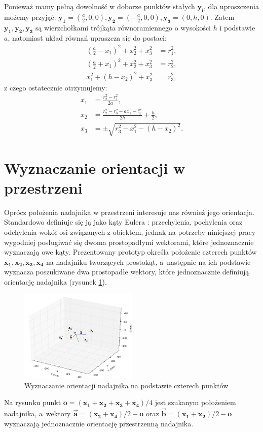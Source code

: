 Ponieważ mamy pełną dowolność w doborze punktów stałych $\boldsymbol{y_i}$, dla uproszczenia możemy przyjąć:
$\boldsymbol{y_1}=(\frac{a}{2},0,0), \boldsymbol{y_2}=(-\frac{a}{2},0,0), \boldsymbol{y_3}=(0,h,0)$. 
Zatem $\boldsymbol{y_1}, \boldsymbol{y_2}, \boldsymbol{y_3}$ są wierzchołkami
trójkąta równoramiennego o wysokości $h$ i podstawie $a$, natomiast układ równań upraszcza
się do postaci:
 \begin{align}
    \nonumber  (\tfrac{a}{2}-x_1)^2 + x_2^2 + x_3^2 &= r_1^2,
 \\ \nonumber  (\tfrac{a}{2}+x_1)^2 + x_2^2 + x_3^2 &= r_2^2,
 \\ \nonumber  x_1^2 + (h-x_2)^2 + x_3^2 &= r_3^2,
 \end{align}
z czego ostatecznie otrzymujemy:
 \begin{align}
    \nonumber  x_1 &= \frac{r_2^2 - r_1^2}{2a},
 \\ \nonumber  x_2 &= \frac{r_2^2 - r_3^2  - a x_1 - \frac{a^2}{4} }{2h}  + \frac{h}{2},
 \\ \nonumber  x_3 &= \pm \sqrt{r_3^2-x_1^2-(h-x_2)^2}.
 \end{align}


\section{Wyznaczanie orientacji w przestrzeni}

Oprócz położenia nadajnika w przestrzeni interesuje nas również jego orientacja.
Standardowo definiuje się ją jako kąty Eulera \cite{bib:katyEulera}: przechylenia, 
pochylenia oraz odchylenia wokół osi związanych z obiektem, jednak na potrzeby niniejszej pracy wygodniej 
posługiwać się dwoma prostopadłymi wektorami, które jednoznacznie wyznaczają owe kąty. 
Prezentowany prototyp określa położenie czterech punktów $\boldsymbol{x_1, x_2, x_3, x_4}$ na nadajniku tworzących prostokąt, a~następnie na ich podstawie wyznacza poszukiwane dwa prostopadłe wektory, które jednoznacznie
definiują orientację nadajnika (rysunek \ref{fig:orientacja}).
 \begin{figure}[H]
    \centering
    \includegraphics[width=0.5\textwidth, trim= 0mm 0mm 0mm 0mm,clip]{orientacja}
    \caption{Wyznaczanie orientacji nadajnika na podstawie czterech punktów}
    \label{fig:orientacja}
\end{figure}
Na rysunku punkt $\boldsymbol{o} = (\boldsymbol{x_1} + \boldsymbol{x_2} + \boldsymbol{x_3} + \boldsymbol{x_4})/4$ jest szukanym położeniem
nadajnika, a~wektory $\boldsymbol{\overrightarrow{a}} = (\boldsymbol{x_2} + \boldsymbol{x_4})/2 - \boldsymbol{o}$ oraz 
$\boldsymbol{\overrightarrow{b}} = (\boldsymbol{x_1} + \boldsymbol{x_2})/2 - \boldsymbol{o}$ wyznaczają jednoznacznie
orientację przestrzenną nadajnika.


